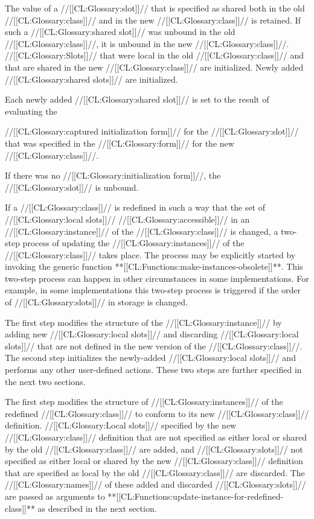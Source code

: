 The value of a //[[CL:Glossary:slot]]//  that is specified as shared both in the old //[[CL:Glossary:class]]// and in the new //[[CL:Glossary:class]]// is retained.   If such a //[[CL:Glossary:shared slot]]// was unbound in the old //[[CL:Glossary:class]]//, it is unbound in the new //[[CL:Glossary:class]]//.   //[[CL:Glossary:Slots]]// that were local in the old //[[CL:Glossary:class]]// and that are shared in the new  //[[CL:Glossary:class]]// are initialized.  Newly added //[[CL:Glossary:shared slots]]// are initialized.

Each newly added //[[CL:Glossary:shared slot]]// is set to the result of evaluating the

//[[CL:Glossary:captured initialization form]]// for the //[[CL:Glossary:slot]]// that was specified  in the  //[[CL:Glossary:form]]// for the new //[[CL:Glossary:class]]//.  

If there was no //[[CL:Glossary:initialization form]]//, the //[[CL:Glossary:slot]]// is unbound.

If a //[[CL:Glossary:class]]// is redefined in such a way that the set of //[[CL:Glossary:local slots]]// //[[CL:Glossary:accessible]]// in an //[[CL:Glossary:instance]]// of the //[[CL:Glossary:class]]//  is changed, a two-step process of updating the //[[CL:Glossary:instances]]// of the //[[CL:Glossary:class]]// takes place.  The process may be explicitly started by  invoking the generic function **[[CL:Functions:make-instances-obsolete]]**.  This two-step process can happen in other circumstances in some implementations. For example, in some implementations this two-step process is triggered if the order of //[[CL:Glossary:slots]]// in storage is changed.

The first step modifies the structure of the //[[CL:Glossary:instance]]// by adding new //[[CL:Glossary:local slots]]// and discarding //[[CL:Glossary:local slots]]// that are not defined in the new version of the //[[CL:Glossary:class]]//.  The second step initializes the newly-added //[[CL:Glossary:local slots]]// and performs any other user-defined actions. These two steps are further specified in the next two sections.



The first step modifies the structure of //[[CL:Glossary:instances]]// of the redefined //[[CL:Glossary:class]]// to conform to its new //[[CL:Glossary:class]]// definition.   //[[CL:Glossary:Local slots]]// specified by the new //[[CL:Glossary:class]]// definition that are not specified as either local or shared by the old //[[CL:Glossary:class]]// are added, and //[[CL:Glossary:slots]]//  not specified as either local or shared by the new //[[CL:Glossary:class]]// definition that are specified as local by the old //[[CL:Glossary:class]]// are discarded.  The //[[CL:Glossary:names]]// of these added and discarded //[[CL:Glossary:slots]]// are passed as arguments  to **[[CL:Functions:update-instance-for-redefined-class]]** as described in the next section.


